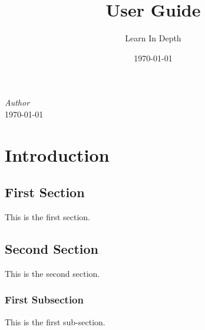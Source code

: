 \documentclass[12pt, letterpaper]{report}
\title{User Guide}
\author{Learn In Depth}
\date{\today}
\begin{document}
\textit{Author}\\
{\large\today}

\newpage

\chapter{Introduction}

\section{First Section}

This is the first section.

\section{Second Section}

This is the second section.

\subsection{First Subsection}

This is the first sub-section.
\end{document}
